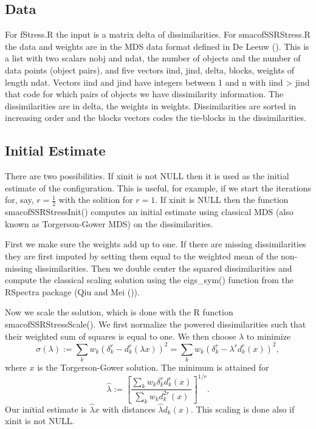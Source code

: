 \documentclass[
  12pt,
  letterpaper,
  DIV=11,
  numbers=noendperiod]{scrartcl}
\begin{document}
\subsection{Data}\label{data}

For fStress.R the input is a matrix delta of dissimilarities. For
smacofSSRStress.R the data and weights are in the MDS data format
defined in De Leeuw (). This is a list
with two scalars nobj and ndat, the number of objects and the number of
data points (object pairs), and five vectors iind, jind, delta, blocks,
weights of length ndat. Vectors iind and jind have integers between 1
and n with iind \textgreater{} jind that code for which pairs of objects
we have dissimilarity information. The dissimilarities are in delta, the
weights in weights. Dissimilarities are sorted in increasing order and
the blocks vectors codes the tie-blocks in the dissimilarities.

\subsection{Initial Estimate}\label{initial-estimate}

There are two possibilities. If xinit is not NULL then it is used as the
initial estimate of the configuration. This is useful, for example, if
we start the iterations for, say, \(r=\tfrac12\) with the solition for
\(r=1\). If xinit is NULL then the function smacofSSRStressInit()
computes an initial estimate using classical MDS (also known as
Torgerson-Gower MDS) on the dissimilarities.

First we make sure the weights add up to one. If there are missing
dissimilarities they are first imputed by setting them equal to the
weighted mean of the non-missing dissimilarities. Then we double center
the squared dissimilarities and compute the classical scaling solution
using the eigs\_sym() function from the RSpectra package (Qiu and Mei
()).

Now we scale the solution, which is done with the R function
smacofSSRStressScale(). We first normalize the powered dissimilarities
such that their weighted sum of squares is equal to one. We then choose
\(\lambda\) to minimize \[
\sigma(\lambda):=\sum_k w_k(\delta_k^r-d_k^r(\lambda x))^2=\sum_k w_k(\delta_k^r-\lambda^rd_k^r(x))^2,
\] where \(x\) is the Torgerson-Gower solution. The minimum is attained
for \[
\hat\lambda:=\left[\frac{\sum_k w_k\delta_k^rd_k^r(x)}{\sum_kw_kd_k^{2r}(x)}\right]^{1/r}.
\] Our initial estimate is \(\hat\lambda x\) with distances
\(\hat\lambda d_k(x)\). This scaling is done also if xinit is not NULL.
\end{document}
